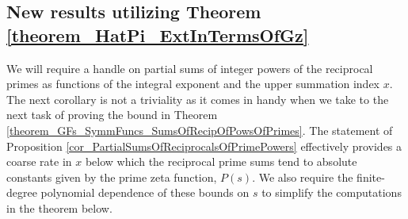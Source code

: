 \documentclass[11pt,reqno,a4letter]{article}
\numberwithin{figure}{section}
\numberwithin{table}{section}
\theoremstyle{plain}
\numberwithin{theorem}{section}
\theoremstyle{definition}
\begin{document}
\subsection{New results utilizing Theorem \ref{theorem_HatPi_ExtInTermsOfGz}} 
\label{subSection_PartialPrimeProducts_Proofs} 

We will require a handle on partial sums of integer powers of the reciprocal primes as 
functions of the integral exponent and the upper summation index $x$. 
The next corollary is not a triviality as it comes in handy when we take to the next task of 
proving the bound in Theorem \ref{theorem_GFs_SymmFuncs_SumsOfRecipOfPowsOfPrimes}. 
The statement of Proposition \ref{cor_PartialSumsOfReciprocalsOfPrimePowers} 
effectively provides a coarse rate in $x$ below which the reciprocal prime sums tend to 
absolute constants given by the prime zeta function, $P(s)$. We also require the finite-degree 
polynomial dependence of these bounds on $s$ to simplify the computations in the theorem below. 
\end{document}
